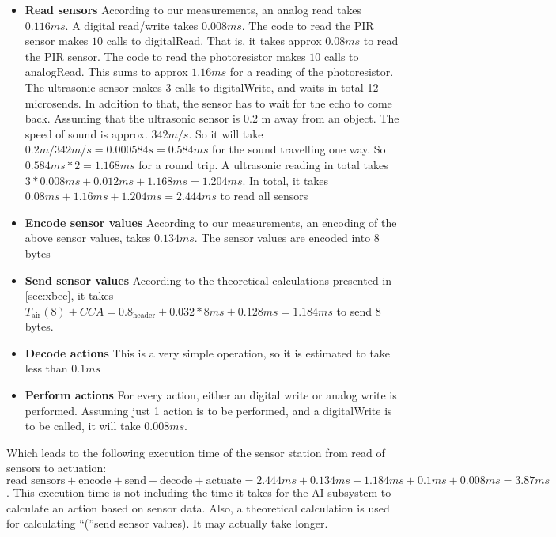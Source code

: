  \begin{itemize}
  \item \textbf{Read sensors} According to our measurements, an analog read takes $0.116 ms$. A digital read/write takes $0.008 ms$. The code to read the PIR sensor makes $10$ calls to digitalRead. That is, it takes approx $0.08 ms$ to read the PIR sensor. The code to read the photoresistor makes $10$ calls to analogRead. This sums to approx $1.16 ms$ for a reading of the photoresistor. The ultrasonic sensor makes 3 calls to digitalWrite, and waits in total 12 microsends. In addition to that, the sensor has to wait for the echo to come back. Assuming that the ultrasonic sensor is $0.2$ m away from an object. The speed of sound is approx. $342 m/s$. So it will take $0.2 m / 342 m/s = 0.000584 s = 0.584 ms$ for the sound travelling one way. So $0.584 ms * 2 = 1.168 ms$ for a round trip. A ultrasonic reading in total takes $3 * 0.008 ms + 0.012 ms + 1.168 ms = 1.204 ms$. In total, it takes $0.08 ms + 1.16 ms + 1.204 ms = 2.444 ms$ to read all sensors
  \item \textbf{Encode sensor values} According to our measurements, an encoding of the above sensor values, takes $0.134 ms$. The sensor values are encoded into 8 bytes
  \item \textbf{Send sensor values} According to the theoretical calculations presented in \cref{sec:xbee}, it takes $T_{\text{air}}(8) + CCA = 0.8_{\text{header}} + 0.032*8 ms + 0.128 ms = 1.184 ms$ to send 8 bytes.
  \item \textbf{Decode actions} This is a very simple operation, so it is estimated to take less than $0.1 ms$
  \item \textbf{Perform actions} For every action, either an digital write or analog write is performed. Assuming just 1 action is to be performed, and a digitalWrite is to be called, it will take $0.008 ms$. 
\end{itemize}

Which leads to the following execution time of the sensor station from read of sensors to actuation: $\text{read sensors} + \text{encode} + \text{send} + \text{decode} + \text{actuate} = 2.444 ms + 0.134 ms + 1.184 ms + 0.1 ms + 0.008 ms = 3.87 ms$. This execution time is not including the time it takes for the AI subsystem to calculate an action based on sensor data. Also, a theoretical calculation is used for calculating \enquote(send sensor values). It may actually take longer.
